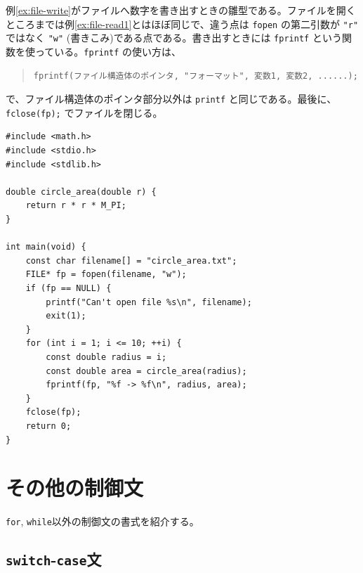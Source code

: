例\ref{ex:file-write}がファイルへ数字を書き出すときの雛型である。ファイルを開くところまでは例\ref{ex:file-read1}とはほぼ同じで、違う点は \texttt{fopen} の第二引数が \texttt{"r"} ではなく \texttt{"w"} (書きこみ)である点である。書き出すときには \texttt{fprintf} という関数を使っている。\texttt{fprintf} の使い方は、
\begin{quote}
    \begin{verbatim}
fprintf(ファイル構造体のポインタ, "フォーマット", 変数1, 変数2, ......);
\end{verbatim}
\end{quote}
で、ファイル構造体のポインタ部分以外は \texttt{printf} と同じである。最後に、\texttt{fclose(fp);} でファイルを閉じる。
\begin{reidai}\label{ex:file-write}
    \begin{verbatim}
#include <math.h>
#include <stdio.h>
#include <stdlib.h>

double circle_area(double r) {
    return r * r * M_PI;
}

int main(void) {
    const char filename[] = "circle_area.txt";
    FILE* fp = fopen(filename, "w");
    if (fp == NULL) {
        printf("Can't open file %s\n", filename);
        exit(1);
    }
    for (int i = 1; i <= 10; ++i) {
        const double radius = i;
        const double area = circle_area(radius);
        fprintf(fp, "%f -> %f\n", radius, area);
    }
    fclose(fp);
    return 0;
}
\end{verbatim}
\end{reidai}

\section{その他の制御文}

\texttt{for}, \texttt{while}以外の制御文の書式を紹介する。

\subsection{\texttt{switch}-\texttt{case}文}

